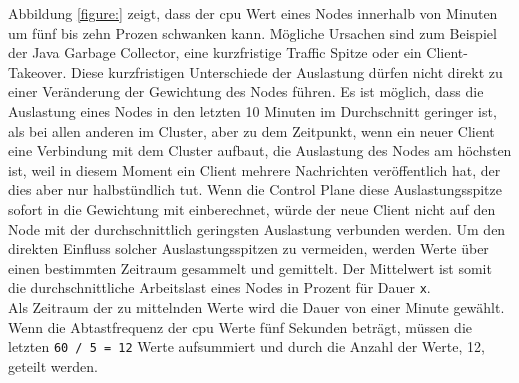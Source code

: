 Abbildung \ref{figure:} zeigt, dass der \ac{cpu} Wert eines Nodes innerhalb von Minuten um fünf bis zehn Prozen schwanken kann. Mögliche Ursachen sind zum Beispiel der Java Garbage Collector, eine kurzfristige Traffic Spitze oder ein Client-Takeover.
Diese kurzfristigen Unterschiede der Auslastung dürfen nicht direkt zu einer Veränderung der Gewichtung des Nodes führen. Es ist möglich, dass die Auslastung eines Nodes in den letzten 10 Minuten im Durchschnitt geringer ist, als bei allen anderen im Cluster, aber zu dem Zeitpunkt, wenn ein neuer Client eine Verbindung mit dem Cluster aufbaut, die Auslastung des Nodes am höchsten ist, weil in diesem Moment ein Client mehrere Nachrichten veröffentlich hat, der dies aber nur halbstündlich tut. Wenn die Control Plane diese Auslastungsspitze sofort in die Gewichtung mit einberechnet, würde der neue Client nicht auf den Node mit der durchschnittlich geringsten Auslastung verbunden werden.
Um den direkten Einfluss solcher Auslastungsspitzen zu vermeiden, werden Werte über einen bestimmten Zeitraum gesammelt und gemittelt. Der Mittelwert ist somit die durchschnittliche Arbeitslast eines Nodes in Prozent für Dauer \verb|x|.
\\
Als Zeitraum der zu mittelnden Werte wird die Dauer von einer Minute gewählt. Wenn die Abtastfrequenz der \ac{cpu} Werte fünf Sekunden beträgt, müssen die letzten \verb|60 / 5 = 12| Werte aufsummiert und durch die Anzahl der Werte, 12, geteilt werden.


